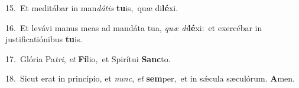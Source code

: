 {\numbfont\textcolor{\numbcolor}{15.}}~Et meditábar in man\-\textit{dá}\-\textit{tis} \textbf{tu}\-is,~\star quæ di\-\textbf{lé}\-xi.\par
{\numbfont\textcolor{\numbcolor}{16.}}~Et levávi manus meas ad mandáta tua, \textit{quæ} \textit{di}\-\textbf{lé}xi:~\star et exercébar in justificatiónibus \textbf{tu}\-is.\par
{\numbfont\textcolor{\numbcolor}{17.}}~Glória Pa\-\textit{tri}\-, \textit{et} \textbf{Fí}\-lio,~\star et Spirítui \textbf{Sanc}\-to.\par
{\numbfont\textcolor{\numbcolor}{18.}}~Sicut erat in princípio, et \textit{nunc}\-, \textit{et} \textbf{sem}\-per,~\star et in sǽcula sæculórum. \textbf{A}\-men.\par
